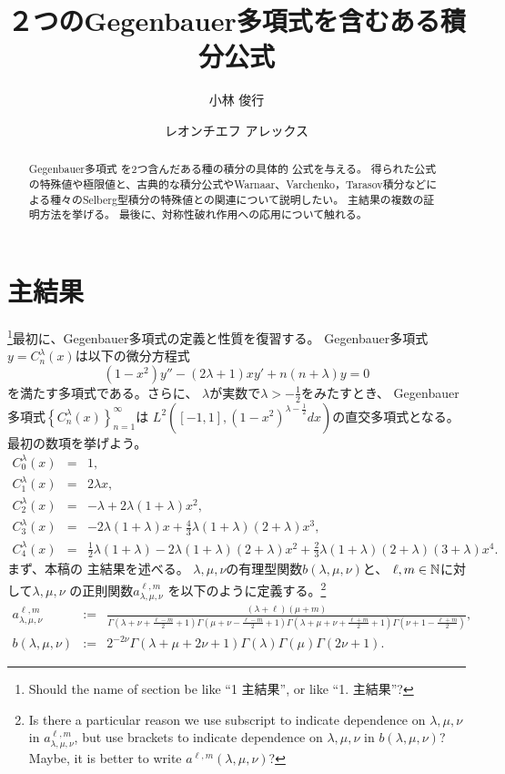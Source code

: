 \documentclass[12pt,a4paper,dvipdfmx]{jsarticle}
\title{２つのGegenbauer多項式を含むある積分公式}
\author{小林 俊行}{東京大学 大学院数理科学研究科、カブリ数物連携宇宙研究機構}{Toshiyuki Kobayashi}{
Graduate School of Mathematical Sciences, the University of Tokyo,\\
Kavli Institute for the Physics and Mathematics of the Universe}
\author{レオンチエフ アレックス}{東京大学 大学院数理科学研究科}{Alex Leontiev}{Graduate School of Mathematical Sciences,
The University of Tokyo}
\numberwithin{equation}{section}
\theoremstyle{jplain}
\theoremstyle{remark}
\theoremstyle{definition}
\begin{document}
\maketitle
\begin{abstract}%
Gegenbauer多項式
を2つ含んだある種の積分の具体的
公式を与える。
得られた公式の特殊値や極限値と、古典的な積分公式やWarnaar、Varchenko，Tarasov積分などによる種々のSelberg型積分の特殊値との関連について説明したい。
主結果の複数の証明方法を挙げる。
最後に、対称性破れ作用への応用について触れる。%
\end{abstract}
\section{主結果}
\footnote{Should the name of section be like ``1 主結果'', or like ``1. 主結果''?}最初に、Gegenbauer多項式の定義と性質を復習する。
	Gegenbauer多項式$y=C^\lambda_n(x)$は以下の微分方程式
	\begin{equation*}
		(1-x^2)y''-(2\lambda+1)xy'+n(n+\lambda)y=0
	\end{equation*}
	を満たす多項式である。さらに、
	$\lambda$が実数で$\lambda>-\frac{1}{2}$をみたすとき、
	Gegenbauer多項式$\left\{ C_n^\lambda(x)\right\}_{n=1}^{\infty}$は
	$L^2\left( [-1,1],(1-x^2)^{\lambda-\frac{1}{2}}dx \right)$の直交多項式とな{る}。
	最初の数項を挙げよう。
		\begin{eqnarray*}
			C_0^\lambda(x)&=&1,\\
			C_1^\lambda(x)&=&2\lambda x,\\
			C_2^\lambda(x)&=&-\lambda+2\lambda(1+\lambda)x^2,\\
			C_3^\lambda(x)&=&-2\lambda(1+\lambda)x+\frac{4}{3}\lambda(1+\lambda)(2+\lambda)x^3,\\
			C_4^\lambda(x)&=&\frac{1}{2}\lambda(1+\lambda)-2\lambda(1+\lambda)(2
			+\lambda)x^2+\frac{2}{3}\lambda(1+\lambda)(2+\lambda)(3+\lambda)x^4.
		\end{eqnarray*}
	まず、本稿の
	主結果を述べる。
	$\lambda,\mu,\nu$の有理型関数$b(\lambda,\mu,\nu)$と、
		$\ell,m\in\mathbb{N}$に対して$\lambda,\mu,\nu$
		の正則関数$a^{\ell,m}_{\lambda,\mu,\nu}$
		を以下のように定義する。\footnote{Is there a particular reason we use subscript to indicate dependence on $\lambda,\mu,\nu$ in $a^{\ell,m}_{\lambda,\mu,\nu}$,
		but use brackets to indicate dependence on $\lambda,\mu,\nu$ in $b(\lambda,\mu,\nu)$? Maybe, it is better to write $a^{\ell,m}(\lambda,\mu,\nu)$?
		}
		\begin{equation*}
		\begin{array}{rcl}
			a_{\lambda,\mu,\nu}^{\ell,m}&:=&\displaystyle
			\frac{ (\lambda + \ell) (\mu + m)}{\Gamma \left( \lambda + \nu + \frac{\ell -
			  m}{2} + 1 \right)  \Gamma \left( \mu + \nu -
			  \frac{\ell - m}{2} + 1 \right)\Gamma \left( \lambda + \mu + \nu + \frac{\ell +
			  m}{2} + 1 \right)\Gamma\left(  \nu+1-\frac{\ell+m}{2}\right)},\\[0.4cm]
			  b(\lambda,\mu,\nu)&:=&2^{-2\nu}\Gamma (\lambda + \mu + 2 \nu + 1){\Gamma (\lambda)
			  \Gamma (\mu)\Gamma \left( 2\nu +
		  1 \right)}.
		\end{array}
		\end{equation*}
\end{document}
